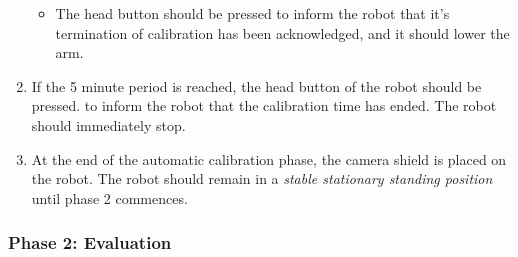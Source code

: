 \begin{enumerate}
\begin{itemize}
        \item The head button should be pressed to inform the robot that it's termination of calibration has been acknowledged, and it should lower the arm.
    \end{itemize} 
    \item If the 5 minute period is reached, the head button of the robot should be pressed. to inform the robot that the calibration time has ended. The robot should immediately stop.
    \item At the end of the automatic calibration phase, the camera shield is placed on the robot. The robot should remain in a \textit{stable stationary standing position} until phase 2 commences.
\end{enumerate} 

\subsubsection{Phase 2: Evaluation}

